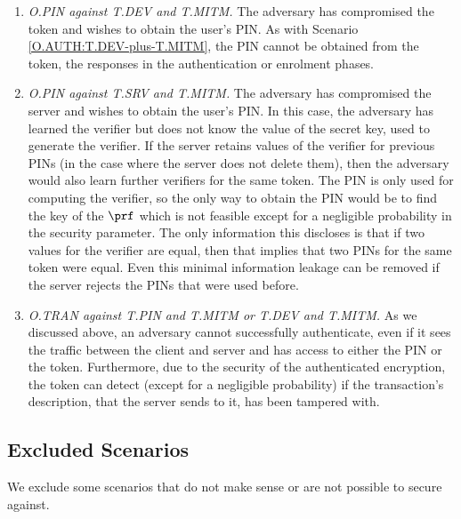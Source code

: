 \begin{enumerate}[leftmargin=5mm]
\item\textit{O.PIN against T.DEV and  T.MITM.}
The adversary has compromised the token and wishes to obtain the user's PIN. As with Scenario \ref{O.AUTH:T.DEV-plus-T.MITM}, the PIN cannot be obtained from the token, the responses in the authentication or enrolment phases.

\item\textit{O.PIN against T.SRV and T.MITM.}
\label{sec:servercompromise}
The adversary has compromised the server and wishes to obtain the user's PIN.
In this case, the adversary has learned the verifier but does not know the value of the secret key, used to generate the verifier. If the server retains values of the verifier for previous PINs (in the case where the server does not delete them), then the adversary would also learn further verifiers for the same token. The PIN is only used for computing the verifier, so the only way to obtain the PIN would be to find the key of the $\prf$ which is not feasible except for a negligible probability in the security parameter. The only information this discloses is that if two values for the verifier are equal, then that implies that two PINs for the same token were equal. Even this minimal information leakage can be removed if the server rejects the PINs that were used before. 

\item\textit{O.TRAN against T.PIN and T.MITM or T.DEV and T.MITM.} As we discussed above, an adversary cannot successfully authenticate, even if it sees the traffic between the client and server and has access to either the PIN or the token. Furthermore, due to the security of the authenticated encryption, the token can detect (except for a negligible probability) if the transaction's description, that the server sends to it, has been tampered with. 
 
\end{enumerate}

\vspace{-2mm}
\subsection{Excluded Scenarios}
\vspace{-1mm}

We exclude some scenarios that do not make sense or are not possible to secure against.

